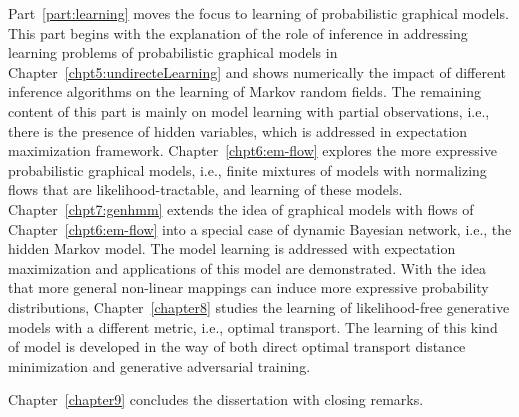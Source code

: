 Part~\ref{part:learning} moves the focus to learning of probabilistic graphical models. This part begins with the explanation of the role of inference in addressing learning problems of probabilistic graphical models in Chapter~\ref{chpt5:undirecteLearning} and shows numerically the impact of different inference algorithms on the learning of Markov random fields. The remaining content of this part is mainly on model learning with partial observations, i.e., there is the presence of hidden variables, which is addressed in expectation maximization framework. Chapter~\ref{chpt6:em-flow} explores the more expressive probabilistic graphical models, i.e., finite mixtures of models with normalizing flows that are likelihood-tractable, and learning of these models. Chapter~\ref{chpt7:genhmm} extends the idea of graphical models with flows of Chapter~\ref{chpt6:em-flow} into a special case of dynamic Bayesian network, i.e., the hidden Markov model. The model learning is addressed with expectation maximization and applications of this model are demonstrated. With the idea that more general non-linear mappings can induce more expressive probability distributions, Chapter~\ref{chapter8} studies the learning of likelihood-free generative models with a different metric, i.e., optimal transport. The learning of this kind of model is developed in the way of both direct optimal transport distance minimization and generative adversarial training.

Chapter~\ref{chapter9} concludes the dissertation with closing remarks.
